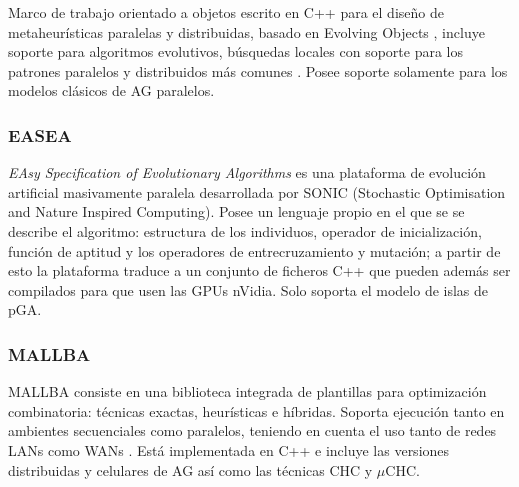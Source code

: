 Marco de trabajo orientado a objetos escrito en C++ para el diseño de metaheurísticas paralelas y distribuidas, basado en Evolving Objects \cite{Keijzer2001}, incluye soporte para algoritmos evolutivos, búsquedas locales con soporte para los patrones paralelos y distribuidos más comunes \cite{PARADISEO}. Posee soporte solamente para los modelos clásicos de AG paralelos.


\subsubsection{EASEA}

\emph{EAsy Specification of Evolutionary Algorithms} es una plataforma de evolución artificial masivamente paralela desarrollada por SONIC (Stochastic Optimisation and Nature Inspired Computing). Posee un lenguaje propio en el que se se describe el algoritmo: estructura de los individuos, operador de inicialización, función de aptitud y los operadores de entrecruzamiento y mutación; a partir de esto la plataforma traduce a un conjunto de ficheros C++ que pueden además ser compilados para que usen las GPUs nVidia. Solo soporta el modelo de islas de pGA.

\subsubsection{MALLBA}

MALLBA consiste en una biblioteca integrada de plantillas para optimización combinatoria: técnicas exactas, heurísticas e híbridas. Soporta ejecución tanto en ambientes secuenciales como paralelos, teniendo en cuenta el uso tanto de redes LANs como WANs \cite{MALLBA}. Está implementada en C++ e incluye las versiones distribuidas y celulares de AG así como las técnicas CHC y $\mu$CHC. 